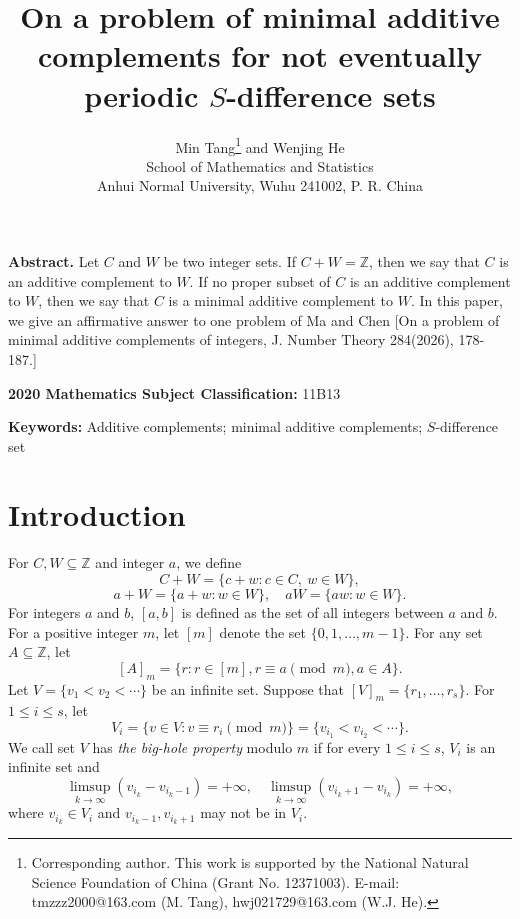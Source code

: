 \documentclass[12pt]{article}
\numberwithin{equation}{section}
\begin{document}
\title{On a problem of minimal additive complements for not eventually periodic $S$-difference sets}
\author{
 Min Tang\footnote{Corresponding author. This work is supported by the National Natural Science Foundation of China (Grant No. 12371003). E-mail: tmzzz2000@163.com (M. Tang), hwj021729@163.com (W.J. He).} and Wenjing He\\
\small  School of Mathematics and Statistics \\
\small  Anhui Normal University,  Wuhu  241002,  P. R. China\\
}
\date{}
\maketitle \baselineskip 14pt

{\bf Abstract.} Let $C$ and $W$ be two integer sets. If $C+W=\mathbb{Z}$, then we say that $C$ is an additive complement to $W$. If no proper subset of $C$ is an additive complement to $W$, then we say that $C$ is a minimal additive complement to $W$. In this paper, we give an affirmative answer to one problem of Ma and Chen [On a problem of minimal additive complements of integers, J. Number Theory 284(2026), 178-187.]

{\bf 2020 Mathematics Subject Classification:} 11B13

{\bf Keywords:} Additive complements; minimal additive complements; $S$-difference set

\section{Introduction}

 For $C,W\subseteq \mathbb{Z}$ and integer $a$, we define
$$C+W= \{c+w:c\in C,~w\in W\},$$ $$a+W=\{a+w:w\in W\},\quad a W=\{aw:w\in W\}.$$
For integers $a$ and $b$, $[a, b]$ is defined as the set of all integers between $a$ and $b$.
For a positive integer $m$, let $[m]$ denote the set $\{0, 1, \ldots, m-1\}$.
For any set $A \subseteq \mathbb{Z}$, let
$$[A]_m = \{r : r \in [m], r \equiv a \pmod{m}, a \in A\}.$$
Let $V = \{v_1 < v_2 < \cdots\}$ be an infinite set. Suppose that $[V]_m = \{r_1, \dots, r_s\}$. For $1 \leqslant i \leqslant s$, let
$$V_i = \{v \in V : v \equiv r_i \pmod m\} = \{v_{i_1} < v_{i_2} < \cdots\}.$$
We call set $V$ has {\it the big-hole property} modulo $m$ if for every $1 \leqslant i \leqslant s$, $V_i$
is an infinite set and $$\limsup_{k \to \infty} (v_{i_k} - v_{i_k-1}) = +\infty, \quad \limsup_{k \to \infty} (v_{i_k+1} - v_{i_k}) = +\infty,$$
where $v_{i_k} \in V_i$ and $v_{i_k-1}, v_{i_k+1}$ may not be in $V_i$.
\end{document}
